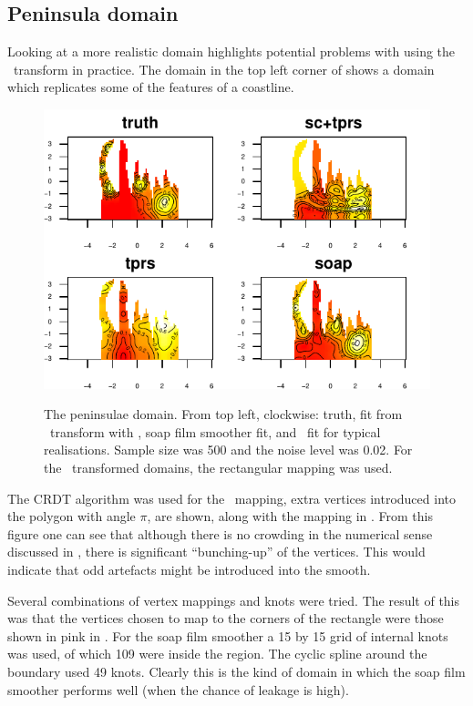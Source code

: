 \subsection{Peninsula domain}
\label{sc-penin}

Looking at a more realistic domain highlights potential problems with using the \sch\ transform in practice. The domain in the top left corner of  shows a domain which replicates some of the features of a coastline.

\begin{figure}[t]
\centering
\includegraphics[width=\textwidth]{sc/figs/wigglytop2-real.pdf} \\
\caption{The peninsulae domain. From top left, clockwise: truth, fit from \sch\ transform with \tprs, soap film smoother fit, and \tprs\ fit for typical realisations. Sample size was 500 and the noise level was 0.02. For the \sch\ transformed domains, the rectangular mapping was used.}
\label{sc-wigglytop2-real}
\end{figure}

The CRDT algorithm was used for the \sch\ mapping, extra vertices introduced into the polygon with angle $\pi$, are shown, along with the mapping in . From this figure one can see that although there is no crowding in the numerical sense discussed in , there is significant ``bunching-up'' of the vertices. This would indicate that odd artefacts might be introduced into the smooth.

Several combinations of vertex mappings and knots were tried. The result of this was that the vertices chosen to map to the corners of the rectangle were those shown in pink in . For the soap film smoother a 15 by 15 grid of internal knots was used, of which 109 were inside the region. The cyclic spline around the boundary used 49 knots. Clearly this is the kind of domain in which the soap film smoother performs well (when the chance of leakage is high).

